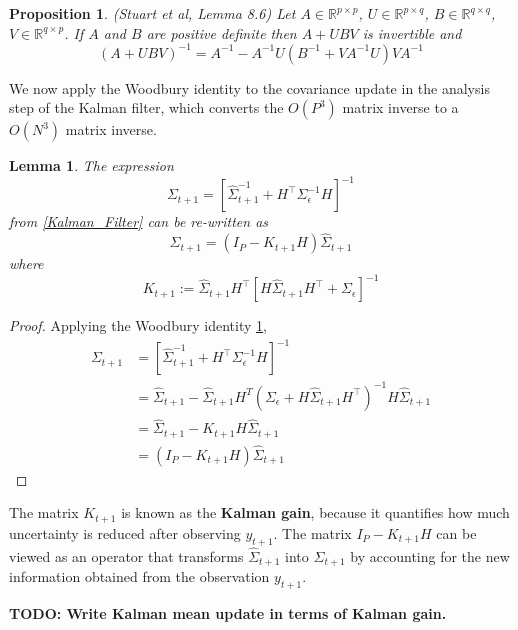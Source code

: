\documentclass[12pt]{article}
\newcommand{\R}{\mathbb{R}}
\newtheorem{prop}{Proposition}
\newtheorem{lemma}{Lemma}
\begin{document}
\begin{prop} (Stuart et al, Lemma 8.6) \label{Woodbury}
Let $A \in \R^{p \times p}$, $U \in \R^{p \times q}$, $B \in \R^{q \times q}$, $V \in \R^{q \times p}$. If $A$ and $B$ are positive definite then $A + UBV$ is invertible 
and 
\[(A + UBV)^{-1} = A^{-1} - A^{-1} U\left(B^{-1} + VA^{-1}U\right)VA^{-1}\]
\end{prop}

We now apply the Woodbury identity to the covariance update in the analysis step of the Kalman filter, which converts the $O(P^3)$ matrix inverse to a $O(N^3)$ 
matrix inverse. 

\begin{lemma} 
The expression 
\[\Sigma_{t + 1} = \left[\hat{\Sigma}^{-1}_{t + 1} + H^\top \Sigma_{\epsilon}^{-1} H \right]^{-1}\]
from \ref{Kalman_Filter} can be re-written as 
\[\Sigma_{t + 1} = \left(I_P - K_{t+1}H \right)\hat{\Sigma}_{t+1}\]
where 
\[K_{t+1} := \hat{\Sigma}_{t+1} H^{\top} \left[H\hat{\Sigma}_{t+1} H^\top + \Sigma_{\epsilon} \right]^{-1} \]
\end{lemma}

\begin{proof}
Applying the Woodbury identity \ref{Woodbury}, 
\begin{align*}
\Sigma_{t + 1} &= \left[\hat{\Sigma}^{-1}_{t + 1} + H^\top \Sigma_{\epsilon}^{-1} H \right]^{-1} \\
		       &= \hat{\Sigma}_{t + 1} - \hat{\Sigma}_{t + 1} H^T \left(\Sigma_{\epsilon} + H\hat{\Sigma}_{t + 1}H^\top \right)^{-1} H \hat{\Sigma}_{t + 1} \\
		       &= \hat{\Sigma}_{t + 1} - K_{t+1} H \hat{\Sigma}_{t + 1} \\
		       &= \left(I_P - K_{t+1}H \right)\hat{\Sigma}_{t+1}
\end{align*}
\end{proof}
The matrix $K_{t + 1}$ is known as the \textbf{Kalman gain}, because it quantifies how much uncertainty is reduced after observing $y_{t+1}$. The matrix 
 $I_P - K_{t+1}H$ can be viewed as an operator that transforms $\hat{\Sigma}_{t+1}$ into $\Sigma_{t + 1}$ by accounting for the new information obtained 
 from the observation $y_{t+1}$. 
 
\textbf{TODO: Write Kalman mean update in terms of Kalman gain.} 

\end{document}
